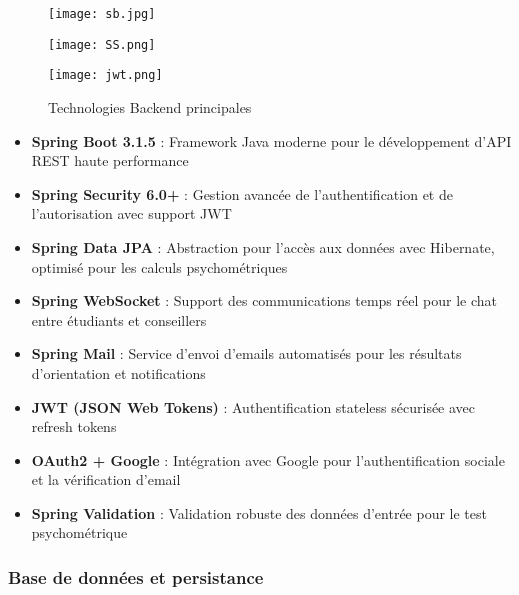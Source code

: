 \documentclass[12pt,a4paper]{report}
\begin{document}
\begin{figure}[H]
\centering
\begin{minipage}{0.2\textwidth}
\centering
\texttt{[image: sb.jpg]}
\end{minipage}
\hfill
\begin{minipage}{0.2\textwidth}
\centering
\texttt{[image: SS.png]}
\end{minipage}
\hfill
\begin{minipage}{0.2\textwidth}
\centering
\texttt{[image: jwt.png]}
\end{minipage}
\hfill

\caption{Technologies Backend principales}
\label{fig:backend-tech}
\end{figure}

\begin{itemize}
    \item \textbf{Spring Boot 3.1.5} : Framework Java moderne pour le développement d'API REST haute performance
    \item \textbf{Spring Security 6.0+} : Gestion avancée de l'authentification et de l'autorisation avec support JWT
    \item \textbf{Spring Data JPA} : Abstraction pour l'accès aux données avec Hibernate, optimisé pour les calculs psychométriques
    \item \textbf{Spring WebSocket} : Support des communications temps réel pour le chat entre étudiants et conseillers
    \item \textbf{Spring Mail} : Service d'envoi d'emails automatisés pour les résultats d'orientation et notifications
    \item \textbf{JWT (JSON Web Tokens)} : Authentification stateless sécurisée avec refresh tokens
    \item \textbf{OAuth2 + Google} : Intégration avec Google pour l'authentification sociale et la vérification d'email
    \item \textbf{Spring Validation} : Validation robuste des données d'entrée pour le test psychométrique
\end{itemize}

\subsubsection{Base de données et persistance}
\end{document}
